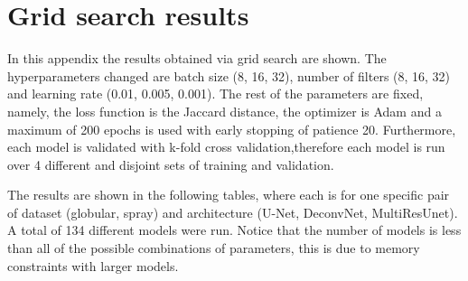 \chapter{Grid search results}\label{appendix_gs}
In this appendix the results obtained via grid search are shown. The hyperparameters changed are batch size (8, 16, 32), number of filters (8, 16, 32) and learning rate (0.01, 0.005, 0.001). The rest of the parameters are fixed, namely, the loss function is the Jaccard distance, the optimizer is Adam and a maximum of 200 epochs is used with early stopping of patience 20. Furthermore, each model is validated with k-fold cross validation,therefore each model is run over 4 different and disjoint sets of training and validation.

The results are shown in the following tables, where each is for one specific pair of dataset (globular, spray) and architecture (U-Net, DeconvNet, MultiResUnet). A total of 134 different models were run.
Notice that the number of models is less than all of the possible combinations of parameters, this is due to memory constraints with larger models.





